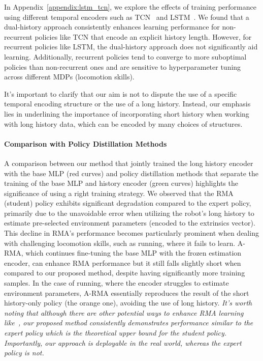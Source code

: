 \begin{remark}
   In Appendix~\ref{appendix:lstm_tcn}, we explore the effects of training performance using different temporal encoders such as TCN~\citep{lee2020learning} and LSTM~\citep{siekmann2020learning}. We found that a dual-history approach consistently enhances learning performance for non-recurrent policies like TCN that encode an explicit history length. However, for recurrent policies like LSTM, the dual-history approach does not significantly aid learning. Additionally, recurrent policies tend to converge to more suboptimal policies than non-recurrent ones and are sensitive to hyperparameter tuning across different MDPs (locomotion skills).
\end{remark}

It's important to clarify that our aim is not to dispute the use of a specific temporal encoding structure or the use of a long history. 
Instead, our emphasis lies in underlining the importance of incorporating short history when working with long history data, which can be encoded by many choices of structures.




\paragraph{Comparison with Policy Distillation Methods}
A comparison between our method that jointly trained the long history encoder with the base MLP (red curves) and policy distillation methods that separate the training of the base MLP and history encoder (green curves) highlights the significance of using a right training strategy. 
We observed that the RMA (student) policy exhibits significant degradation compared to the expert policy, primarily due to the unavoidable error when utilizing the robot's long history to estimate pre-selected environment parameters (encoded to the extrinsics vector). 
This decline in RMA's performance becomes particularly prominent when dealing with challenging locomotion skills, such as running, where it fails to learn.
A-RMA, which continues fine-tuning the base MLP with the frozen estimation encoder, can enhance RMA performance but it still falls slightly short when compared to our proposed method, despite having significantly more training samples. 
In the case of running, where the encoder struggles to estimate environment parameters, A-RMA essentially reproduces the result of the short history-only policy (the orange one), avoiding the use of long history.
\emph{It's worth noting that although there are other potential ways to enhance RMA learning like~\cite{fu2023deep}, our proposed method consistently demonstrates performance similar to the expert policy which is the theoretical upper bound for the student policy. Importantly, our approach is deployable in the real world, whereas the expert policy is not.}




